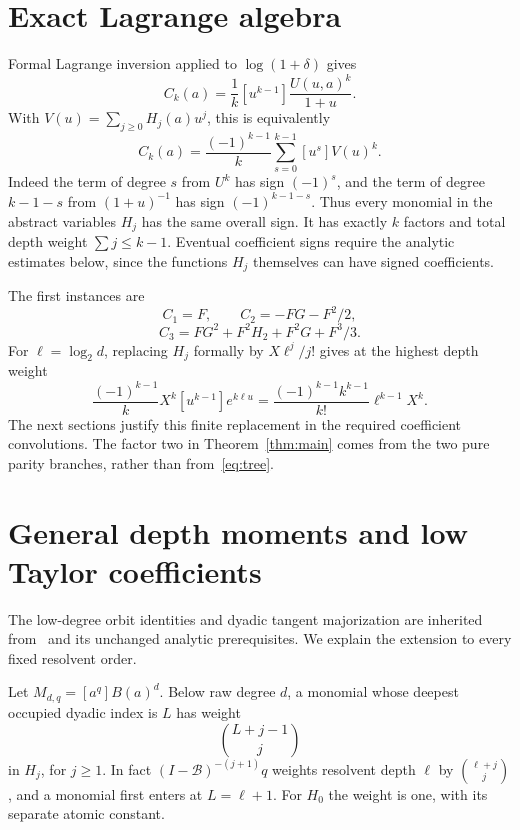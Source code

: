 \documentclass[11pt,a4paper]{article}
\theoremstyle{remark}\newtheorem*{ednote}{Editorial note (ProveIt, 2026-10-01)}
\begin{document}
\section{Exact Lagrange algebra}
Formal Lagrange inversion applied to $\log(1+\delta)$ gives
\begin{equation}\label{eq:Lagrange}
 C_k(a)=\frac1k[u^{k-1}]\frac{U(u,a)^k}{1+u}.
\end{equation}
With $V(u)=\sum_{j\ge0}H_j(a)u^j$, this is equivalently
\begin{equation}\label{eq:signpoly}
 C_k(a)=\frac{(-1)^{k-1}}k
        \sum_{s=0}^{k-1}[u^s]V(u)^k.
\end{equation}
Indeed the term of degree $s$ from $U^k$ has sign $(-1)^s$, and the term of degree $k-1-s$ from $(1+u)^{-1}$ has sign $(-1)^{k-1-s}$. Thus every monomial in the abstract variables $H_j$ has the same overall sign. It has exactly $k$ factors and total depth weight $\sum j\le k-1$. Eventual coefficient signs require the analytic estimates below, since the functions $H_j$ themselves can have signed coefficients.

The first instances are
\[
 C_1=F,\qquad C_2=-FG-F^2/2,
\]
\[
 C_3=FG^2+F^2H_2+F^2G+F^3/3.
\]
For $\ell=\log_2d$, replacing $H_j$ formally by $X\ell^j/j!$ gives at the highest depth weight
\begin{equation}\label{eq:tree}
 \frac{(-1)^{k-1}}kX^k[u^{k-1}]e^{k\ell u}
 =\frac{(-1)^{k-1}k^{k-1}}{k!}\ell^{k-1}X^k.
\end{equation}
The next sections justify this finite replacement in the required coefficient convolutions. The factor two in Theorem~\ref{thm:main} comes from the two pure parity branches, rather than from~\eqref{eq:tree}.

\section{General depth moments and low Taylor coefficients}
The low-degree orbit identities and dyadic tangent majorization are inherited from~\cite{First} and its unchanged analytic prerequisites. We explain the extension to every fixed resolvent order.

Let $M_{d,q}=[a^q]B(a)^d$. Below raw degree $d$, a monomial whose deepest occupied dyadic index is $L$ has weight
\begin{equation}\label{eq:mark}
 \binom{L+j-1}{j}
\end{equation}
in $H_j$, for $j\ge1$. In fact $(I-\mathcal B)^{-(j+1)}q$ weights resolvent depth $\ell$ by $\binom{\ell+j}{j}$, and a monomial first enters at $L=\ell+1$. For $H_0$ the weight is one, with its separate atomic constant.
\end{document}
